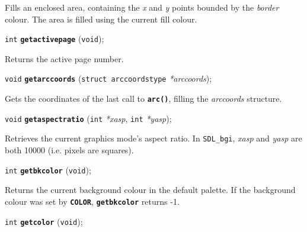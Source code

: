 \documentclass[a4paper,12pt]{article}
\newcommand{\SDLbgi}{\texttt{SDL\_bgi}}
\newcommand{\V}{\texttt{void}}      %
\newcommand{\I}{\texttt{int}}       %
\newcommand{\func}[1]{\textbf{\texttt{#1}}}  %
\newcommand{\A}[1]{\emph{#1}}       %
\newenvironment{bgi}
{ %
  \begin{snugshade}
}
{ %
  \end{snugshade}
}
\begin{document}
Fills an enclosed area, containing the \A{x} and \A{y} points bounded
by the \A{border} colour. The area is filled using the current fill
colour.


\label{sec:getactivepage}

\begin{bgi}
\I{} \func{getactivepage} (\V{});
\end{bgi}

Returns the active page number.


\label{sec:getarccoords}

\begin{bgi}
\V{} \func{getarccoords} (\texttt{struct arccoordstype} \A{*arccoords});
\end{bgi}

Gets the coordinates of the last call to \func{arc()}, filling the
\A{arccoords} structure.


\label{sec:getaspectratio}

\begin{bgi}
\V{} \func{getaspectratio} (\I{} \A{*xasp}, \I{} \A{*yasp});
\end{bgi}

Retrieves the current graphics mode's aspect ratio. In \SDLbgi,
\A{xasp} and \A{yasp} are both 10000 (i.e. pixels are squares).


\label{sec:getbkcolor}

\begin{bgi}
\I{} \func{getbkcolor} (\V{});
\end{bgi}

Returns the current background colour in the default palette. If the
background colour was set by \func{COLOR}, \func{getbkcolor} returns
-1.


\label{sec:getcolor}

\begin{bgi}
\I{} \func{getcolor} (\V{});
\end{bgi}
\end{document}
